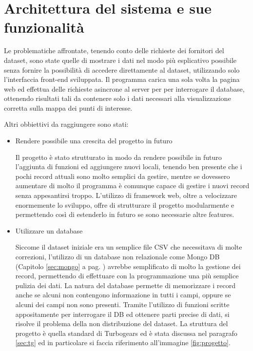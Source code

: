 \chapter{Architettura del sistema e sue funzionalità}\label{cap:funzionamento}%
Le problematiche affrontate, tenendo conto delle richieste dei fornitori del dataset, sono state quelle di mostrare i dati nel modo più esplicativo possibile senza fornire la possibilità di accedere direttamente al dataset, utilizzando solo l'interfaccia front-end sviluppata. Il programma carica una sola volta la pagina web ed effettua delle richieste asincrone al server per per interrogare il database, ottenendo risultati tali da contenere solo i dati necessari alla visualizzazione corretta sulla mappa dei punti di interesse.

Altri obbiettivi da raggiungere sono stati:
\begin{itemize}
	\item Rendere possibile una crescita del progetto in futuro

Il progetto è stato strutturato in modo da rendere possibile in futuro l'aggiunta di funzioni ed aggiungere nuovi locali, tenendo ben presente che i pochi record attuali sono molto semplici da gestire, mentre se dovessero aumentare di molto il programma è comunque capace di gestire i nuovi record senza appesantirsi troppo. L'utilizzo di framework web, oltre a velocizzare enormemente lo sviluppo, offre di strutturare il progetto modularmente e permettendo così di estenderlo in futuro se sono necessarie altre features.

	\item Utilizzare un database

Siccome il dataset iniziale era un semplice file CSV che necessitava di molte correzioni, l'utilizzo di un database non relazionale come Mongo DB (Capitolo \ref{sec:mongo} a pag. \pageref{sec:mongo} ) avrebbe semplificato di molto la gestione dei record, permettendo di effettuare con la programmazione una più semplice pulizia dei dati. La natura del database permette di memorizzare i record anche se alcuni non contengono informazione in tutti i campi, oppure se alcuni dei campi non sono presenti. Tramite l'utilizzo di funzioni scritte appositamente per interrogare il DB ed ottenere parti precise di dati, si risolve il problema della non distribuzione del dataset.
La struttura del progetto è quella standard di Turbogears ed è stata discussa nel paragrafo \ref{sec:tg} ed in particolare si faccia riferimento all'immagine \ref{fig:progetto}.

\end{itemize}

